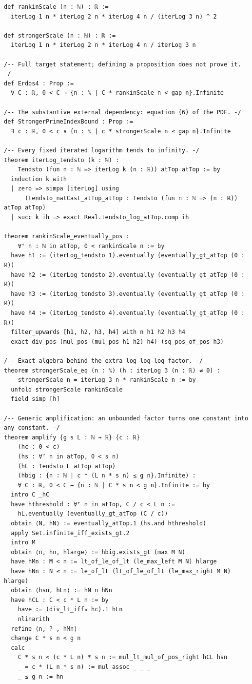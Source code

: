 \begin{verbatim}
def rankinScale (n : ℕ) : ℝ :=
  iterLog 1 n * iterLog 2 n * iterLog 4 n / (iterLog 3 n) ^ 2

def strongerScale (n : ℕ) : ℝ :=
  iterLog 1 n * iterLog 2 n * iterLog 4 n / iterLog 3 n

/-- Full target statement; defining a proposition does not prove it. -/
def Erdos4 : Prop :=
  ∀ C : ℝ, 0 < C → {n : ℕ | C * rankinScale n < gap n}.Infinite

/-- The substantive external dependency: equation (6) of the PDF. -/
def StrongerPrimeIndexBound : Prop :=
  ∃ c : ℝ, 0 < c ∧ {n : ℕ | c * strongerScale n ≤ gap n}.Infinite

/-- Every fixed iterated logarithm tends to infinity. -/
theorem iterLog_tendsto (k : ℕ) :
    Tendsto (fun n : ℕ => iterLog k (n : ℝ)) atTop atTop := by
  induction k with
  | zero => simpa [iterLog] using
      (tendsto_natCast_atTop_atTop : Tendsto (fun n : ℕ => (n : ℝ)) atTop atTop)
  | succ k ih => exact Real.tendsto_log_atTop.comp ih

theorem rankinScale_eventually_pos :
    ∀ᶠ n : ℕ in atTop, 0 < rankinScale n := by
  have h1 := (iterLog_tendsto 1).eventually (eventually_gt_atTop (0 : ℝ))
  have h2 := (iterLog_tendsto 2).eventually (eventually_gt_atTop (0 : ℝ))
  have h3 := (iterLog_tendsto 3).eventually (eventually_gt_atTop (0 : ℝ))
  have h4 := (iterLog_tendsto 4).eventually (eventually_gt_atTop (0 : ℝ))
  filter_upwards [h1, h2, h3, h4] with n h1 h2 h3 h4
  exact div_pos (mul_pos (mul_pos h1 h2) h4) (sq_pos_of_pos h3)

/-- Exact algebra behind the extra log-log-log factor. -/
theorem strongerScale_eq (n : ℕ) (h : iterLog 3 (n : ℝ) ≠ 0) :
    strongerScale n = iterLog 3 n * rankinScale n := by
  unfold strongerScale rankinScale
  field_simp [h]

/-- Generic amplification: an unbounded factor turns one constant into any constant. -/
theorem amplify {g s L : ℕ → ℝ} {c : ℝ}
    (hc : 0 < c)
    (hs : ∀ᶠ n in atTop, 0 < s n)
    (hL : Tendsto L atTop atTop)
    (hbig : {n : ℕ | c * (L n * s n) ≤ g n}.Infinite) :
    ∀ C : ℝ, 0 < C → {n : ℕ | C * s n < g n}.Infinite := by
  intro C _hC
  have hthreshold : ∀ᶠ n in atTop, C / c < L n :=
    hL.eventually (eventually_gt_atTop (C / c))
  obtain ⟨N, hN⟩ := eventually_atTop.1 (hs.and hthreshold)
  apply Set.infinite_iff_exists_gt.2
  intro M
  obtain ⟨n, hn, hlarge⟩ := hbig.exists_gt (max M N)
  have hMn : M < n := lt_of_le_of_lt (le_max_left M N) hlarge
  have hNn : N ≤ n := le_of_lt (lt_of_le_of_lt (le_max_right M N) hlarge)
  obtain ⟨hsn, hLn⟩ := hN n hNn
  have hCL : C < c * L n := by
    have := (div_lt_iff₀ hc).1 hLn
    nlinarith
  refine ⟨n, ?_, hMn⟩
  change C * s n < g n
  calc
    C * s n < (c * L n) * s n := mul_lt_mul_of_pos_right hCL hsn
    _ = c * (L n * s n) := mul_assoc _ _ _
    _ ≤ g n := hn


\end{verbatim}
